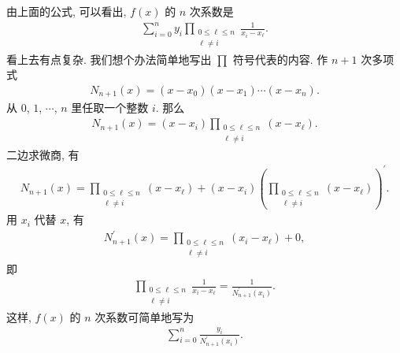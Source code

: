 \begin{remark}
    由上面的公式, 可以看出, $f(x)$ 的 $n$ 次系数是
    \begin{align*}
        \sum_{i = 0}^{n} y_i \prod_{\begin{smallmatrix}0 \leq \ell \leq n \\\ell \neq i\end{smallmatrix}} \frac{1}{x_i - x_\ell}.
    \end{align*}
    看上去有点复杂. 我们想个办法简单地写出 $\prod$ 符号代表的内容. 作 $n+1$ 次多项式
    \begin{align*}
        N_{n+1} (x) = (x - x_0) (x - x_1) \cdots (x - x_n).
    \end{align*}
    从 $0$, $1$, $\cdots$, $n$ 里任取一个整数 $i$. 那么
    \begin{align*}
        N_{n+1} (x) = (x - x_i) \prod_{\begin{smallmatrix}0 \leq \ell \leq n \\\ell \neq i\end{smallmatrix}} (x - x_\ell).
    \end{align*}
    二边求微商, 有
    \begin{align*}
        N_{n+1} (x) = \prod_{\begin{smallmatrix}0 \leq \ell \leq n \\\ell \neq i\end{smallmatrix}} (x - x_\ell) + (x - x_i) \left( \prod_{\begin{smallmatrix}0 \leq \ell \leq n \\\ell \neq i\end{smallmatrix}} (x - x_\ell) \right)^{\prime}.
    \end{align*}
    用 $x_i$ 代替 $x$, 有
    \begin{align*}
        N_{n+1}^{\prime} (x) = \prod_{\begin{smallmatrix}0 \leq \ell \leq n \\\ell \neq i\end{smallmatrix}} (x_i - x_\ell) + 0,
    \end{align*}
    即
    \begin{align*}
        \prod_{\begin{smallmatrix}0 \leq \ell \leq n \\\ell \neq i\end{smallmatrix}} \frac{1}{x_i - x_\ell} = \frac{1}{N_{n+1}^{\prime} (x_i)}.
    \end{align*}
    这样, $f(x)$ 的 $n$ 次系数可简单地写为
    \begin{align*}
        \sum_{i = 0}^{n} \frac{y_i}{N_{n+1}^{\prime} (x_i)}.
    \end{align*}
\end{remark}

